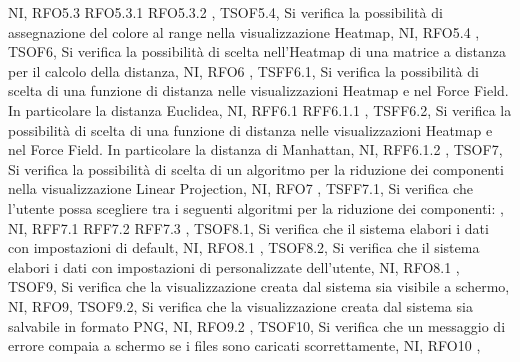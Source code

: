 {{        NI,
        RFO5.3 RFO5.3.1 RFO5.3.2
    },
    {   
        TSOF5.4,
        Si verifica la possibilità di assegnazione del colore al range nella visualizzazione Heatmap,
        NI,
        RFO5.4
    },
    {   
        TSOF6,
        Si verifica la possibilità di scelta nell'Heatmap di una matrice a distanza per il calcolo della distanza,
        NI,
        RFO6
    },
    {   
        TSFF6.1,
        Si verifica la possibilità di scelta di una funzione di distanza nelle visualizzazioni Heatmap e nel Force Field. In particolare la distanza Euclidea,
        NI,
        RFF6.1 RFF6.1.1
    },
    {   
        TSFF6.2,
        Si verifica la possibilità di scelta di una funzione di distanza nelle visualizzazioni Heatmap e nel Force Field. In particolare la distanza di Manhattan,
        NI,
        RFF6.1.2
    },
    {   
        TSOF7,
        Si verifica la possibilità di scelta di un algoritmo per la riduzione dei componenti nella visualizzazione Linear Projection,
        NI,
        RFO7
    },
    {   
        TSFF7.1,
        Si verifica che l'utente possa scegliere tra i seguenti algoritmi per la riduzione dei componenti:
        ,
        NI,
        RFF7.1 RFF7.2 RFF7.3
    },
    {   
        TSOF8.1,
        Si verifica che il sistema elabori i dati con impostazioni di default,
        NI,
        RFO8.1
    },
    {   
        TSOF8.2,
        Si verifica che il sistema elabori i dati con impostazioni di personalizzate dell'utente,
        NI,
        RFO8.1
    },
    {   
        TSOF9,
        Si verifica che la visualizzazione creata dal sistema sia visibile a schermo,
        NI,
        RFO9},
    {   
        TSOF9.2,
        Si verifica che la visualizzazione creata dal sistema sia salvabile in formato PNG,
        NI,
        RFO9.2
    },
    {   
        TSOF10,
        Si verifica che un messaggio di errore compaia a schermo se i files sono caricati scorrettamente,
        NI,
        RFO10
    },
    }
    
    
